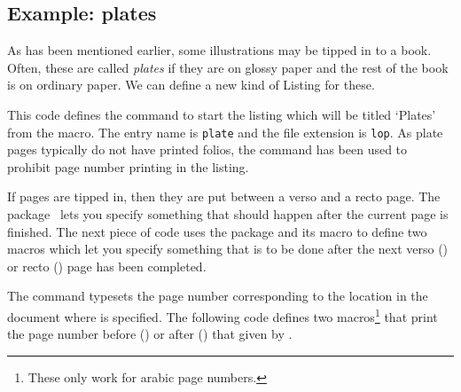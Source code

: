 \subsection{Example: plates}

    As has been mentioned earlier, some illustrations
may be tipped in to a book. Often, these are called 
\emph{plates} if they are on glossy paper 
and the rest of the book is on ordinary paper.
We can define a new kind of Listing for these.

\begin{lcode}
\newcommand{\listplatename}{Plates}
\newlistof{listofplates}{lop}{\listplatename}
\end{lcode}
This code defines the \cmd{\listofplates} command to start the listing 
which will be titled `Plates' from the \cmd{\listplatename} macro. 
The entry name is \texttt{plate} and the file extension is \texttt{lop}. 
As plate pages typically do not have printed folios, 
the \cmd{\cftpagenumbersoff} command has been used to prohibit page 
number printing in the listing.

    If pages are tipped in, then they are put between a verso and 
a recto page. The  package~\cite{AFTERPAGE} lets 
you specify something that should happen after the current page 
is finished. The next piece of code uses the package and its 
\cmd{\afterpage} macro to define two macros which let you specify 
something that is to be done after the next verso (\cmd{\afternextverso})
or recto (\cmd{\afternextrecto}) page has been completed.
\begin{lcode}
\newcommand{\afternextverso}[1]{%
  \afterpage{\ifodd\c@page #1\else\afterpage{#1}\fi}}
\newcommand{\afternextrecto}[1]{%
  \afterpage{\ifodd\c@page\afterpage{#1}\else #1\fi}}
\end{lcode}


    The \cmd{\pageref} command typesets the page number
corresponding to the location in the document where 
\cmd{\label} is specified. The following code defines
two macros\footnote{These only work for arabic page numbers.} 
that print the page number before (\cmd{\priorpageref}) or after 
(\cmd{\nextpageref}) that given by \cmd{\pageref}.
\begin{lcode}
\newcommand{\priorpageref}[1]{%
  \setcounter{mempref}{\pageref{#1}}\addtocounter{mempref}{-1}\themempref}
\newcommand{\nextpageref}[1]{%
  \setcounter{mempref}{\pageref{#1}}\addtocounter{mempref}{1}\themempref}
\end{lcode}

